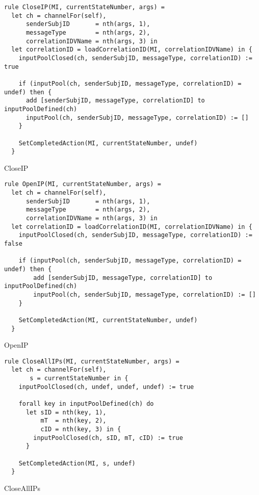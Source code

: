 \begin{listing}[H]
\begin{verbatim}
rule CloseIP(MI, currentStateNumber, args) =
  let ch = channelFor(self),
      senderSubjID       = nth(args, 1),
      messageType        = nth(args, 2),
      correlationIDVName = nth(args, 3) in
  let correlationID = loadCorrelationID(MI, correlationIDVName) in {
    inputPoolClosed(ch, senderSubjID, messageType, correlationID) := true

    if (inputPool(ch, senderSubjID, messageType, correlationID) = undef) then {
      add [senderSubjID, messageType, correlationID] to inputPoolDefined(ch)
      inputPool(ch, senderSubjID, messageType, correlationID) := []
    }

    SetCompletedAction(MI, currentStateNumber, undef)
  }
\end{verbatim}
\caption{CloseIP}
\label{lst:asm:CloseIP}
\end{listing}




\begin{listing}[H]
\begin{verbatim}
rule OpenIP(MI, currentStateNumber, args) =
  let ch = channelFor(self),
      senderSubjID       = nth(args, 1),
      messageType        = nth(args, 2),
      correlationIDVName = nth(args, 3) in
  let correlationID = loadCorrelationID(MI, correlationIDVName) in {
    inputPoolClosed(ch, senderSubjID, messageType, correlationID) := false

    if (inputPool(ch, senderSubjID, messageType, correlationID) = undef) then {
        add [senderSubjID, messageType, correlationID] to inputPoolDefined(ch)
        inputPool(ch, senderSubjID, messageType, correlationID) := []
    }

    SetCompletedAction(MI, currentStateNumber, undef)
  }
\end{verbatim}
\caption{OpenIP}
\label{lst:asm:OpenIP}
\end{listing}




\begin{listing}[H]
\begin{verbatim}
rule CloseAllIPs(MI, currentStateNumber, args) =
  let ch = channelFor(self),
       s = currentStateNumber in {
    inputPoolClosed(ch, undef, undef, undef) := true

    forall key in inputPoolDefined(ch) do
      let sID = nth(key, 1),
          mT  = nth(key, 2),
          cID = nth(key, 3) in {
        inputPoolClosed(ch, sID, mT, cID) := true
      }

    SetCompletedAction(MI, s, undef)
  }
\end{verbatim}
\caption{CloseAllIPs}
\label{lst:asm:CloseAllIPs}
\end{listing}




